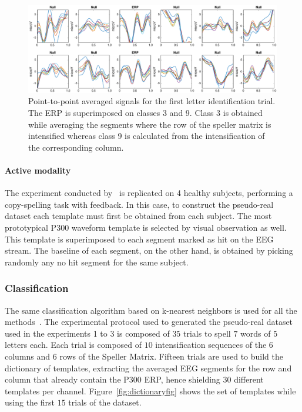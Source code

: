 \documentclass[brainsci,article,submit,moreauthors,pdftex,10pt,a4paper]{mdpi}
\begin{document}
\begin{figure}[H]
\centering
\includegraphics[width=1.0\linewidth]{images/GainCheck.eps}
\caption{Point-to-point averaged signals for the first letter identification trial.  The ERP is superimposed on classes 3 and 9.  Class 3 is obtained while averaging the segments where the row of the speller matrix is intensified whereas class 9 is calculated from the intensification of the corresponding column.}
\label{fig:gaincheck}
\end{figure}


\paragraph{Active modality}

The experiment conducted by~\citep{Riccio2013} is replicated on 4 healthy subjects, performing a copy-spelling task with feedback.  In this case, to construct the pseudo-real dataset each template must first be obtained from each subject.  The most prototypical P300 waveform template is selected by visual observation as well.  This template is superimposed to each segment marked as hit on the EEG stream.  The baseline of each segment, on the other hand, is obtained by picking randomly any no hit segment for the same subject.


\subsubsection{Classification} \label{section:classification}

The same classification algorithm based on k-nearest neighbors is used for all the methods~\citep{Boiman2008}.   The experimental protocol used to generated the pseudo-real dataset used in the experiments 1 to 3 is composed of $35$ trials to spell $7$ words of $5$ letters each.  Each trial is composed of $10$ intensification sequences of the $6$ columns and $6$ rows of the Speller Matrix.  Fifteen trials are used to build the dictionary of templates, extracting the averaged EEG segments for the row and column that already contain the P300 ERP, hence shielding $30$ different templates per channel.  Figure~\ref{fig:dictionaryfig} shows the set of templates while using the first $15$ trials of the dataset.
\end{document}
